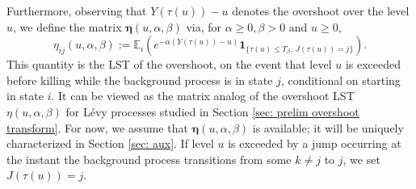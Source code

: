 \documentclass[reqno,12pt]{amsart}
\newcommand{\bs}{\boldsymbol}
\begin{document}
Furthermore, observing that $Y(\tau(u)) - u$ denotes the overshoot over the level $u$, we define the matrix $\bs\eta(u,\alpha,\beta)$ via, for $\alpha\geqslant0, \beta > 0$ and $u\geqslant0$,
\begin{equation}\label{eq: eta definition}
    \eta_{ij} (u,\alpha,\beta):= \mathbb{E}_i\left(e^{-\alpha(Y(\tau(u)) - u)}\bs{1}_{\{\tau(u) \leqslant T_{\beta},\,J(\tau(u)) = j\}}\right).
\end{equation}
This quantity is the LST of the overshoot, on the event that level $u$ is exceeded before killing while the background process is in state $j$, conditional on starting in state $i$. It can be viewed as the matrix analog of the overshoot LST $\eta(u,\alpha,\beta)$ for Lévy processes studied in Section \ref{sec: prelim overshoot transform}.
For now, we assume that ${\bs \eta}(u,\alpha,\beta)$ is available; it will be uniquely characterized in Section \ref{sec: aux}. If level $u$ is exceeded by a jump occurring at the instant the background process transitions from some $k \neq j$ to $j$, we set $J(\tau(u)) = j$.
\end{document}
